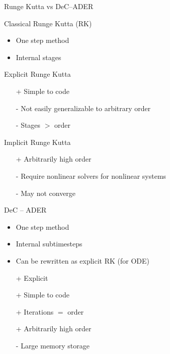 \documentclass[aspectratio=169]{beamer}
\begin{document}
\begin{frame}{Runge Kutta vs DeC--ADER}
	\begin{minipage}{0.54\textwidth}
		\begin{block}{Classical Runge Kutta (RK)}
			\begin{itemize}
				\item One step method\item Internal stages
			\end{itemize}
			Explicit Runge Kutta
			\begin{itemize}
				\item[\color{green}+] Simple to code 
				\item[\color{red}-] Not easily generalizable to arbitrary order
				\item[\color{red}-] Stages $>$ order 
			\end{itemize}
			Implicit Runge Kutta
			\begin{itemize}
				\item[\color{green}+] Arbitrarily high order
				\item[\color{red}-] Require nonlinear solvers for nonlinear systems
				\item[\color{red}-] May not converge
			\end{itemize}
		\end{block}
	\end{minipage}
	\hfill
	\begin{minipage}{0.41\textwidth}
		\begin{block}{DeC -- ADER}
			\begin{itemize}
				\item One step method\item Internal subtimesteps \item Can be rewritten as explicit RK (for ODE)
				\item[\color{green}+] Explicit
				\item[\color{green}+] Simple to code 
				\item[\color{green}+] Iterations $=$ order 
				\item[\color{green}+] Arbitrarily high order
				\item[\color{red}-] Large memory storage
			\end{itemize}
		\end{block}
	\end{minipage}
	
	
\end{frame}
\end{document}
